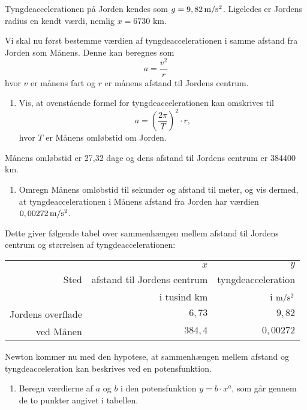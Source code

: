 \documentclass[12pt,oneside,a4paper]{article}
\newcommand{\be}{\begin{equation}}
\newcommand{\ee}{\end{equation}}
\theoremstyle{plain}
\begin{document}
Tyngdeaccelerationen på Jorden kendes som $g=9,82\, {\rm m}/{\rm s}^2$.
Ligeledes er Jordens radius en kendt værdi, nemlig $x=6730$ km.

Vi skal nu først bestemme værdien af tyngdeaccelerationen i samme af\-stand fra
Jorden som Månens.  Denne kan beregnes som
\be
a = \frac{v^2}{r}
\label{acc}
\ee
hvor $v$ er månens fart og $r$ er månens afstand til Jordens centrum. 

\begin{enumerate}[label=(\alph*)]
    \item Vis, at ovenstående formel for tyngdeaccelerationen kan omskrives til 
        $$
        a = \left(\frac{2\pi}{T}\right)^2 \cdot r,
        $$
        hvor $T$ er Månens omløbstid om Jorden. \label{a}
\end{enumerate}

Månens omløbstid er 27,32 dage og dens afstand til Jordens centrum er 384400 km.

\begin{enumerate}[label=(\alph*) ,resume]
    \item Omregn Månens omløbstid til sekunder og afstand til meter, og vis
        dermed, at tyngdeaccelerationen i Månens afstand fra Jorden har værdien
        $0,00272\, {\rm m}/{\rm s}^2$.
\end{enumerate}

Dette giver følgende tabel over sammenhængen mellem afstand til Jordens centrum
og størrelsen af tyngdeaccelerationen:

\begin{center}
\begin{tabular}{r|r|r}
    \hline
          & $x$                         & $y$ \\
    Sted  & afstand til Jordens centrum & tyngdeacceleration   \\
          & i tusind km                 & i ${\rm m}/{\rm s}^2$  \\
    \hline 
    Jordens overflade & $6,73$  & $9,82$ \\
    ved Månen         & $384,4$ & $0,00272$ \\
    \hline 
\end{tabular}
\end{center}

Newton kommer nu med den hypotese, at sammenhængen mellem afstand og
tyngdeacceleration kan beskrives ved en potensfunktion.

\begin{enumerate}[label=(\alph*) ,resume]
    \item Beregn værdierne af $a$ og $b$ i den potensfunktion $y=b\cdot x^a$,
        som går gennem de to punkter angivet i tabellen. \label{p1}
\end{enumerate}
\end{document}
